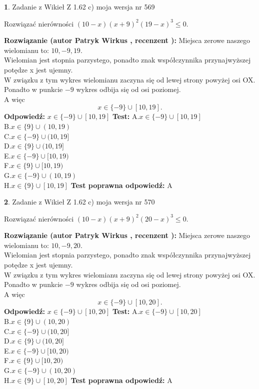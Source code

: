 \documentclass[12pt, a4paper]{article}
\theoremstyle{definition} %
\newtheorem{zad}{}
\newcommand{\zadStart}[1]{\begin{zad}#1\newline}
\newcommand{\zadStop}{\end{zad}}
\newcommand{\rozwStart}[2]{\noindent \textbf{Rozwiązanie (autor #1 , recenzent #2): }\newline}
\newcommand{\rozwStop}{\newline}
\newcommand{\odpStart}{\noindent \textbf{Odpowiedź:}\newline}
\newcommand{\odpStop}{\newline}
\newcommand{\testStart}{\noindent \textbf{Test:}\newline}
\newcommand{\testStop}{\newline}
\newcommand{\kluczStart}{\noindent \textbf{Test poprawna odpowiedź:}\newline}
\newcommand{\kluczStop}{\newline}
\begin{document}
\zadStart{Zadanie z Wikieł Z 1.62 c) moja wersja nr 569}

Rozwiązać nierówności $(10-x)(x+9)^{2}(19-x)^{3}\le0$.
\zadStop
\rozwStart{Patryk Wirkus}{}
Miejsca zerowe naszego wielomianu to: $10, -9, 19$.\\
Wielomian jest stopnia parzystego, ponadto znak współczynnika przy\linebreak najwyższej potędze x jest ujemny.\\ W związku z tym wykres wielomianu zaczyna się od lewej strony powyżej osi OX.\\
Ponadto w punkcie $-9$ wykres odbija się od osi poziomej.\\
A więc $$x \in \{-9\} \cup [10,19].$$
\rozwStop
\odpStart
$x \in \{-9\} \cup [10,19]$
\odpStop
\testStart
A.$x \in \{-9\} \cup [10,19]$\\
B.$x \in \{9\} \cup (10,19)$\\
C.$x \in \{-9\} \cup (10,19]$\\
D.$x \in \{9\} \cup (10,19]$\\
E.$x \in \{-9\} \cup [10,19)$\\
F.$x \in \{9\} \cup [10,19)$\\
G.$x \in \{-9\} \cup (10,19)$\\
H.$x \in \{9\} \cup [10,19]$
\testStop
\kluczStart
A
\kluczStop



\zadStart{Zadanie z Wikieł Z 1.62 c) moja wersja nr 570}

Rozwiązać nierówności $(10-x)(x+9)^{2}(20-x)^{3}\le0$.
\zadStop
\rozwStart{Patryk Wirkus}{}
Miejsca zerowe naszego wielomianu to: $10, -9, 20$.\\
Wielomian jest stopnia parzystego, ponadto znak współczynnika przy\linebreak najwyższej potędze x jest ujemny.\\ W związku z tym wykres wielomianu zaczyna się od lewej strony powyżej osi OX.\\
Ponadto w punkcie $-9$ wykres odbija się od osi poziomej.\\
A więc $$x \in \{-9\} \cup [10,20].$$
\rozwStop
\odpStart
$x \in \{-9\} \cup [10,20]$
\odpStop
\testStart
A.$x \in \{-9\} \cup [10,20]$\\
B.$x \in \{9\} \cup (10,20)$\\
C.$x \in \{-9\} \cup (10,20]$\\
D.$x \in \{9\} \cup (10,20]$\\
E.$x \in \{-9\} \cup [10,20)$\\
F.$x \in \{9\} \cup [10,20)$\\
G.$x \in \{-9\} \cup (10,20)$\\
H.$x \in \{9\} \cup [10,20]$
\testStop
\kluczStart
A
\kluczStop
\end{document}
